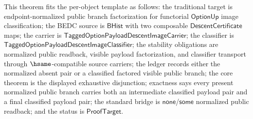\begin{theorem}
\label{thm:tagged-option-composite-image-classifier-normalized-public-branch-factorization}
This theorem fits the per-object template as follows: the traditional target is
endpoint-normalized public branch factorization for functorial
$\mathsf{OptionUp}$ image classification; the BEDC source is $\mathsf{BHist}$
with two composable $\mathsf{DescentCertificate}$ maps; the carrier is
$\mathsf{TaggedOptionPayloadDescentImageCarrier}$; the classifier is
$\mathsf{TaggedOptionPayloadDescentImageClassifier}$; the stability obligations
are normalized public readback, visible payload factorization, and classifier
transport through $\hsame$-compatible source carriers; the ledger records either
the normalized absent pair or a classified factored visible public branch; the
core theorem is the displayed exhaustive disjunction; exactness says every
present normalized public branch carries both an intermediate classified payload
pair and a final classified payload pair; the standard bridge is
$\mathsf{none}$/$\mathsf{some}$ normalized public readback; and the status is
$\mathsf{ProofTarget}$.


\end{theorem}
